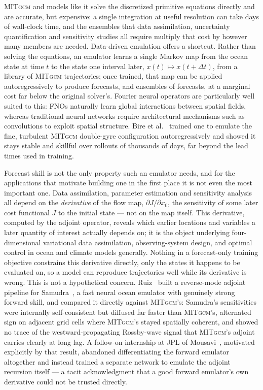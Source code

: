 \documentclass[3p,12pt]{elsarticle}
\newcommand{\MITgcm}{\textsc{MITgcm}}
\newcommand{\FNO}{FNO}
\begin{document}
\MITgcm{} and models like it solve the discretized primitive equations directly
and are accurate, but expensive: a single integration at useful resolution can
take days of wall-clock time, and the ensembles that data assimilation,
uncertainty quantification and sensitivity studies all require multiply that
cost by however many members are needed. Data-driven emulation offers a
shortcut. Rather than solving the equations, an emulator learns a single Markov
map from the ocean state at time $t$ to the state one interval later,
$x(t)\mapsto x(t+\Delta t)$, from a library of \MITgcm{}
trajectories; once trained, that map can be applied autoregressively to produce
forecasts, and ensembles of forecasts, at a marginal cost far below the original
solver's. Fourier neural operators are particularly well suited to this:
\FNO{}s naturally learn global interactions between spatial fields, whereas
traditional neural networks require architectural mechanisms such as
convolutions to exploit spatial structure. Bire et
al.~\cite{Bire2025} trained one to emulate the fine, turbulent \MITgcm{}
double-gyre configuration autoregressively and showed it stays stable and
skillful over rollouts of thousands of days, far beyond the lead times used in
training.

Forecast skill is not the only property such an emulator needs, and for the
applications that motivate building one in the first place it is not even the
most important one. Data assimilation, parameter estimation and sensitivity
analysis all depend on the \emph{derivative} of the flow map,
$\partial J/\partial x_0$, the sensitivity of some later cost functional
$J$ to the initial state --- not on the map itself. This derivative, computed by
the adjoint operator, reveals which earlier locations and variables a later
quantity of interest actually depends on; it is the object underlying
four-dimensional variational data assimilation, observing-system design, and
optimal control in ocean and climate models generally. Nothing in a
forecast-only training objective constrains this derivative directly, only the
states it happens to be evaluated on, so a model can reproduce trajectories well
while its derivative is wrong. This is not a hypothetical concern. Ruiz~\cite{Ruiz2025}
built a reverse-mode adjoint pipeline for Samudra~\cite{Dheeshjith2025}, a fast
neural ocean emulator with genuinely strong forward skill, and compared it
directly against \MITgcm{}'s: Samudra's sensitivities were internally
self-consistent but diffused far faster than \MITgcm{}'s, alternated sign on
adjacent grid cells where \MITgcm{}'s stayed spatially coherent, and showed no
trace of the westward-propagating Rossby-wave signal that \MITgcm{}'s adjoint
carries clearly at long lag. A follow-on internship at JPL of Mousavi~\cite{Mousavi2025},
motivated explicitly by that result, abandoned differentiating the forward
emulator altogether and instead trained a separate network to emulate the
adjoint recursion itself --- a tacit acknowledgment that a good forward
emulator's own derivative could not be trusted directly.
\end{document}
